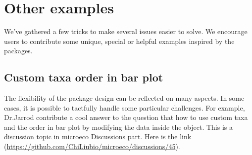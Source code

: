 \documentclass[
]{book}
\newenvironment{Shaded}{\begin{snugshade}}{\end{snugshade}}
\newcommand{\AttributeTok}[1]{\textcolor[rgb]{0.77,0.63,0.00}{#1}}
\newcommand{\CommentTok}[1]{\textcolor[rgb]{0.56,0.35,0.01}{\textit{#1}}}
\newcommand{\ConstantTok}[1]{\textcolor[rgb]{0.00,0.00,0.00}{#1}}
\newcommand{\DecValTok}[1]{\textcolor[rgb]{0.00,0.00,0.81}{#1}}
\newcommand{\FloatTok}[1]{\textcolor[rgb]{0.00,0.00,0.81}{#1}}
\newcommand{\FunctionTok}[1]{\textcolor[rgb]{0.00,0.00,0.00}{#1}}
\newcommand{\NormalTok}[1]{#1}
\newcommand{\OtherTok}[1]{\textcolor[rgb]{0.56,0.35,0.01}{#1}}
\newcommand{\SpecialCharTok}[1]{\textcolor[rgb]{0.00,0.00,0.00}{#1}}
\newcommand{\StringTok}[1]{\textcolor[rgb]{0.31,0.60,0.02}{#1}}
\begin{document}
\begin{Shaded}
\end{Shaded}

\hypertarget{other-examples-1}{%
\chapter{Other examples}\label{other-examples-1}}

We've gathered a few tricks to make several issues easier to solve.
We encourage users to contribute some unique, special or helpful examples inspired by the packages.

\hypertarget{custom-taxa-order-in-bar-plot}{%
\section{Custom taxa order in bar plot}\label{custom-taxa-order-in-bar-plot}}

The flexibility of the package design can be reflected on many aspects.
In some cases, it is possible to tactfully handle some particular challenges.
For example, Dr.Jarrod contribute a cool answer to the question that how to use custom taxa and the order in bar plot by modifying the data inside the object.
This is a discussion topic in microeco Discussions part. Here is the link (\url{https://github.com/ChiLiubio/microeco/discussions/45}).
\end{document}
